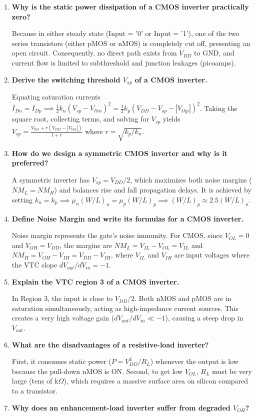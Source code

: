 \documentclass[12pt,a4paper]{article}
\newcommand{\Q}[1]{\textbf{#1}\par\noindent\ignorespaces}
\begin{document}
\begin{tcolorbox}[exambox, title={\textbf{Frequently Asked / Viva Questions}}]
\begin{enumerate}[topsep=0pt, label=\textbf{Q\arabic*.}, itemsep=5pt]
  \item \Q{Why is the static power dissipation of a CMOS inverter practically zero?}
    Because in either steady state (Input = '0' or Input = '1'), one of the two series transistors (either pMOS or nMOS) is completely cut off, presenting an open circuit. Consequently, no direct path exists from $V_{DD}$ to GND, and current flow is limited to subthreshold and junction leakages (picoamps).
  \item \Q{Derive the switching threshold $V_{sp}$ of a CMOS inverter.}
    Equating saturation currents $I_{Dn} = I_{Dp} \implies \frac{1}{2} k_n (V_{sp} - V_{thn})^2 = \frac{1}{2} k_p (V_{DD} - V_{sp} - |V_{thp}|)^2$. Taking the square root, collecting terms, and solving for $V_{sp}$ yields $V_{sp} = \frac{V_{thn} + r(V_{DD} - |V_{thp}|)}{1+r}$ where $r = \sqrt{k_p/k_n}$.
  \item \Q{How do we design a symmetric CMOS inverter and why is it preferred?}
    A symmetric inverter has $V_{sp} = V_{DD}/2$, which maximizes both noise margins ($NM_L = NM_H$) and balances rise and fall propagation delays. It is achieved by setting $k_n = k_p \implies \mu_n(W/L)_n = \mu_p(W/L)_p \implies (W/L)_p \approx 2.5(W/L)_n$.
  \item \Q{Define Noise Margin and write its formulas for a CMOS inverter.}
    Noise margin represents the gate's noise immunity. For CMOS, since $V_{OL}=0$ and $V_{OH}=V_{DD}$, the margins are $NM_L = V_{IL} - V_{OL} = V_{IL}$ and $NM_H = V_{OH} - V_{IH} = V_{DD} - V_{IH}$, where $V_{IL}$ and $V_{IH}$ are input voltages where the VTC slope $dV_{out}/dV_{in} = -1$.
  \item \Q{Explain the VTC region 3 of a CMOS inverter.}
    In Region 3, the input is close to $V_{DD}/2$. Both nMOS and pMOS are in saturation simultaneously, acting as high-impedance current sources. This creates a very high voltage gain ($dV_{out}/dV_{in} \ll -1$), causing a steep drop in $V_{out}$.
  \item \Q{What are the disadvantages of a resistive-load inverter?}
    First, it consumes static power ($P = V_{DD}^2/R_L$) whenever the output is low because the pull-down nMOS is ON. Second, to get low $V_{OL}$, $R_L$ must be very large (tens of $\text{k}\Omega$), which requires a massive surface area on silicon compared to a transistor.
  \item \Q{Why does an enhancement-load inverter suffer from degraded $V_{OH}$?}

\end{enumerate}
\end{tcolorbox}
\end{document}
